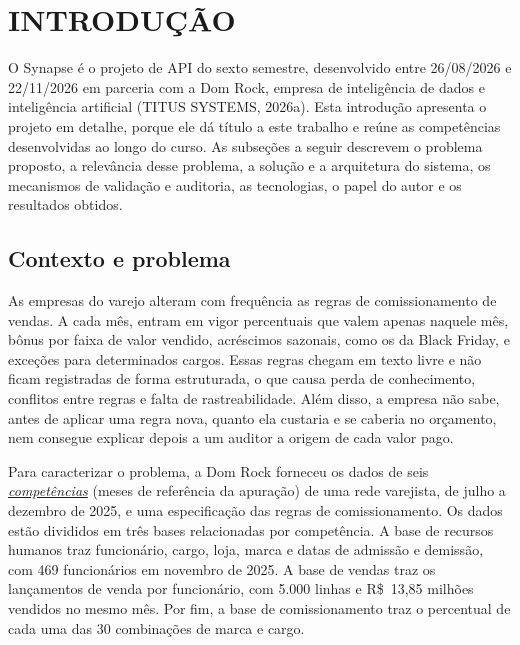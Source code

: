 \documentclass[12pt,a4paper]{article}
\newcommand{\termo}[2]{\hyperlink{gls:#1}{\textit{#2}}}
\newcounter{paginasalvas}
\begin{document}
\setcounter{paginasalvas}{\value{page}}
\setcounter{page}{\value{paginasalvas}}

\section{INTRODUÇÃO}

O Synapse é o projeto de API do sexto semestre, desenvolvido entre 26/08/2026 e 22/11/2026 em parceria com a Dom Rock, empresa de inteligência de dados e inteligência artificial (TITUS SYSTEMS, 2026a). Esta introdução apresenta o projeto em detalhe, porque ele dá título a este trabalho e reúne as competências desenvolvidas ao longo do curso. As subseções a seguir descrevem o problema proposto, a relevância desse problema, a solução e a arquitetura do sistema, os mecanismos de validação e auditoria, as tecnologias, o papel do autor e os resultados obtidos.

\subsection{Contexto e problema}

As empresas do varejo alteram com frequência as regras de comissionamento de vendas. A cada mês, entram em vigor percentuais que valem apenas naquele mês, bônus por faixa de valor vendido, acréscimos sazonais, como os da Black Friday, e exceções para determinados cargos. Essas regras chegam em texto livre e não ficam registradas de forma estruturada, o que causa perda de conhecimento, conflitos entre regras e falta de rastreabilidade. Além disso, a empresa não sabe, antes de aplicar uma regra nova, quanto ela custaria e se caberia no orçamento, nem consegue explicar depois a um auditor a origem de cada valor pago.

Para caracterizar o problema, a Dom Rock forneceu os dados de seis \termo{competencia}{competências} (meses de referência da apuração) de uma rede varejista, de julho a dezembro de 2025, e uma especificação das regras de comissionamento. Os dados estão divididos em três bases relacionadas por competência. A base de recursos humanos traz funcionário, cargo, loja, marca e datas de admissão e demissão, com 469 funcionários em novembro de 2025. A base de vendas traz os lançamentos de venda por funcionário, com 5.000 linhas e R\$~13,85 milhões vendidos no mesmo mês. Por fim, a base de comissionamento traz o percentual de cada uma das 30 combinações de marca e cargo.
\end{document}
